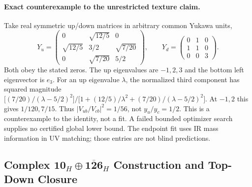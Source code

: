 \documentclass[11pt,a4paper]{article}
\begin{document}
\paragraph{Exact counterexample to the unrestricted texture claim.}
Take real symmetric up/down matrices in arbitrary common Yukawa units,
\[
 Y_u=\begin{pmatrix}
 0&\sqrt{12/5}&0\\ \sqrt{12/5}&3/2&\sqrt{7/20}\\0&\sqrt{7/20}&5/2
 \end{pmatrix},
 \qquad Y_d=\begin{pmatrix}0&1&0\\1&1&0\\0&0&3\end{pmatrix}.
\]
Both obey the stated zeros. The up eigenvalues are $-1,2,3$ and
the bottom left eigenvector is $e_3$. For an up eigenvalue $\lambda$,
the normalized third component has squared magnitude
$\big[(7/20)/(\lambda-5/2)^2\big]/\big[1+(12/5)/\lambda^2+
(7/20)/(\lambda-5/2)^2\big]$. At $-1,2$ this gives $1/120,7/15$.
Thus $|V_{ub}/V_{cb}|^2=1/56$, not $y_u/y_c=1/2$.
This is a counterexample to the identity, not a fit. A failed bounded
optimizer search supplies no certified global lower bound. The endpoint
fit uses IR mass information in UV matching; those entries are not
blind predictions.

\subsection{Complex \texorpdfstring{$\mathbf{10}_H \oplus \overline{\mathbf{126}}_H$}{10H + 126barH} Construction and Top-Down Closure}
\label{subsec:complex-spin10-closure}
\end{document}
